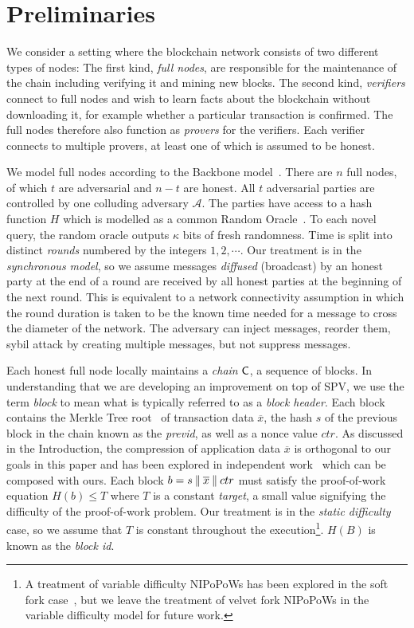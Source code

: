 \section{Preliminaries}

We consider a setting where the blockchain network consists of two different
types of nodes: The first kind, \emph{full nodes}, are responsible for the
maintenance of the chain including verifying it and mining new blocks. The
second kind, \emph{verifiers} connect to full nodes and wish to learn facts
about the blockchain without downloading it, for example whether a particular
transaction is confirmed. The full nodes therefore also function as
\emph{provers} for the verifiers. Each verifier connects to multiple provers, at
least one of which is assumed to be honest.

We model full nodes according to the Backbone model~\cite{backbone}. There are
$n$ full nodes, of which $t$ are adversarial and $n - t$ are honest. All $t$
adversarial parties are controlled by one colluding adversary $\mathcal{A}$. The
parties have access to a hash function $H$ which is modelled as a common Random
Oracle~\cite{ro}. To each novel query, the random oracle outputs $\kappa$ bits
of fresh randomness. Time is split into distinct \emph{rounds} numbered by the
integers $1, 2, \cdots$. Our treatment is in the \emph{synchronous model}, so we
assume messages \emph{diffused} (broadcast) by an honest party at the end of a
round are received by all honest parties at the beginning of the next round.
This is equivalent to a network connectivity assumption in which the round
duration is taken to be the known time needed for a message to cross the
diameter of the network. The adversary can inject messages, reorder them, sybil
attack by creating multiple messages, but not suppress messages.

Each honest full node locally maintains a \emph{chain} $\mathsf{C}$, a sequence of
blocks. In understanding that we are developing an improvement on top of SPV, we
use the term \emph{block} to mean what is typically referred to as a
\emph{block header}. Each block contains the Merkle Tree root~\cite{merkle} of
transaction data $\overline{x}$, the hash $s$ of the previous block in the chain
known as the \emph{previd}, as well as a nonce value $ctr$. As discussed in the
Introduction, the compression of application data $\overline{x}$ is orthogonal
to our goals in this paper and has been explored in independent
work~\cite{edrax} which can be composed with ours. Each block $b = s \mathbin{\|}
\overline{x} \mathbin{\|} ctr$ must satisfy the proof-of-work~\cite{pow} equation $H(b) \leq T$
where $T$ is a constant \emph{target}, a small value signifying the difficulty
of the proof-of-work problem. Our treatment is in the \emph{static difficulty}
case, so we assume that $T$ is constant throughout the execution\footnote{A
treatment of variable difficulty NIPoPoWs has been explored in the soft fork
case~\cite{dionyziz}, but we leave the treatment of velvet fork NIPoPoWs in the
variable difficulty model for future work.}. $H(B)$ is
known as the \emph{block id}.


